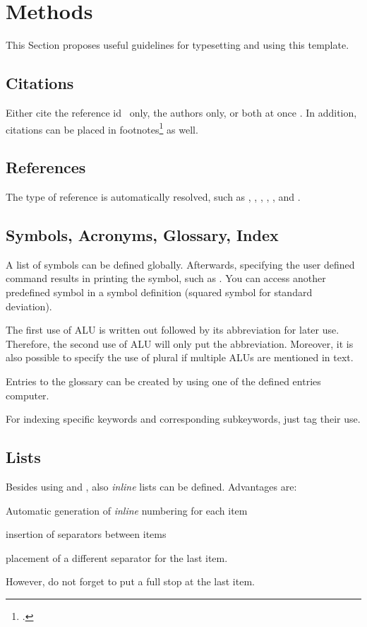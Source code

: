 \chapter{Methods}\label{sec:methods}
This Section proposes useful guidelines for typesetting and using this template.

\section{Citations}
Either cite the reference id~\parencite{RKHT17} only, the authors
\citeauthor{RKHT17} only, or both at once \eg \textcite[see][51\psq]{MGBCR04}.
In addition, citations can be placed in
footnotes\footcite[see][50\psqq]{MGBCR04} as well.

\section{References}
The type of reference is automatically resolved, such as ,
, , ,
, and .

\section{Symbols, Acronyms, Glossary, Index}
A list of symbols can be defined globally. Afterwards, specifying the user
defined command results in printing the symbol, such as \stddev. You can access
another predefined symbol in a symbol definition \eg \variance (squared symbol
for standard deviation).

The first use of \ac{ALU} is written out followed by its abbreviation for later
use. Therefore, the second use of \ac{ALU} will only put the abbreviation.
Moreover, it is also possible to specify the use of plural if multiple
\acp{ALU} are mentioned in text.

Entries to the glossary can be created by using one of the defined entries \eg
\gls{computer}.

For indexing specific keywords and
corresponding subkeywords, just tag their use.

\section{Lists}
Besides using  and , also \emph{inline} lists can
be defined. Advantages are:
\begin{enumerate*}[label=\upshape(\alph*),itemjoin={{; }},itemjoin*={{; and }}]
  \item Automatic generation of \emph{inline} numbering for each item
  \item insertion of separators between items
  \item placement of a different separator for the last item.
\end{enumerate*}
However, do not forget to put a full stop at the last item.

